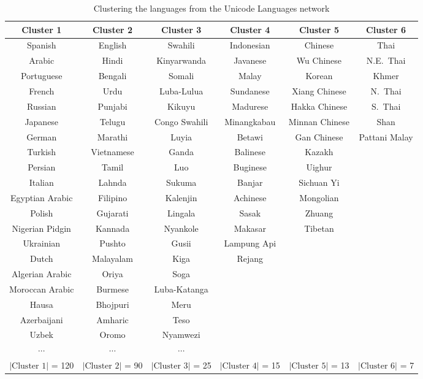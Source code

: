 \documentclass[12pt,draft]{ociamthesis}
\theoremstyle{plain}
\theoremstyle{definition}
\theoremstyle{remark}
\begin{document}
\vspace*{0.5cm}
\begin{table}[H]
  \centering
  \scriptsize
  \begin{tabular}{ |c|c|c|c|c|c| }
    \hline
    \rule{0pt}{1.2em}
    Cluster 1 & Cluster 2 & Cluster 3 & Cluster 4 &
    Cluster 5 & Cluster 6 \\[0.1cm]
    \hline \rule{0pt}{1.2em}
    Spanish & English & Swahili & Indonesian & Chinese & Thai \\
    Arabic & Hindi & Kinyarwanda & Javanese & Wu Chinese & N.E.\ Thai \\
    Portuguese & Bengali & Somali & Malay & Korean & Khmer \\
    French & Urdu & Luba-Lulua & Sundanese & Xiang Chinese & N.\ Thai \\
    Russian & Punjabi & Kikuyu & Madurese & Hakka Chinese & S.\ Thai \\
    Japanese & Telugu & Congo Swahili & Minangkabau & Minnan Chinese & Shan \\
    German & Marathi & Luyia & Betawi & Gan Chinese & Pattani Malay \\
    Turkish & Vietnamese & Ganda & Balinese & Kazakh & \\
    Persian & Tamil & Luo & Buginese & Uighur & \\
    Italian & Lahnda & Sukuma & Banjar & Sichuan Yi & \\
    Egyptian Arabic & Filipino & Kalenjin & Achinese & Mongolian & \\
    Polish & Gujarati & Lingala & Sasak & Zhuang & \\
    Nigerian Pidgin & Kannada & Nyankole & Makasar & Tibetan & \\
    Ukrainian & Pushto & Gusii & Lampung Api & & \\
    Dutch & Malayalam & Kiga & Rejang & & \\
    Algerian Arabic & Oriya & Soga & & & \\
    Moroccan Arabic & Burmese & Luba-Katanga & & & \\
    Hausa & Bhojpuri & Meru & & & \\
    Azerbaijani & Amharic & Teso & & & \\
    Uzbek & Oromo & Nyamwezi & & & \\
    $\cdots$ & $\cdots$ & $\cdots$ & & & \\
    $|\textrm{Cluster\ } 1 |$ = 120 &
    $|\textrm{Cluster\ } 2 |$ = 90 &
    $|\textrm{Cluster\ } 3 |$ = 25 &
    $|\textrm{Cluster\ } 4 |$ = 15 &
    $|\textrm{Cluster\ } 5 |$ = 13 &
    $|\textrm{Cluster\ } 6 |$ = 7
    \\[0.1cm]
    \hline
  \end{tabular}
  \caption{Clustering the languages from the Unicode Languages network}
  \label{tab:bipartite_languages_dest_clusters}
\end{table}
\end{document}
